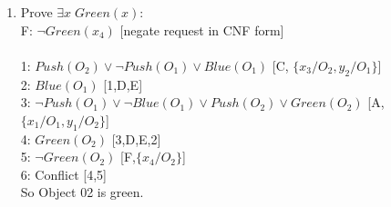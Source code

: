 \documentclass{article}
\begin{document}
\begin{enumerate}
\begin{enumerate}
	\item Prove $\exists x \; Green(x)$: \\
	F: $\neg Green(x_4)$ [negate request in CNF form]\\
	\\
	1: $Push(O_2) \lor \neg Push(O_1) \lor Blue(O_1)$ [C, $\{x_3/O_2,y_2/O_1\}$] \\
	2: $Blue(O_1)$ [1,D,E] \\
	3: $\neg Push(O_1) \lor \neg Blue(O_1) \lor Push(O_2) \lor Green(O_2)$ [A,$\{x_1/O_1,y_1/O_2\}$] \\
	4: $Green(O_2)$ [3,D,E,2] \\
	5: $\neg Green(O_2)$ [F,$\{x_4/O_2\}$] \\
	6: Conflict [4,5] \\
	So Object 02 is green.
	\end{enumerate}


\end{enumerate}
\end{document}
